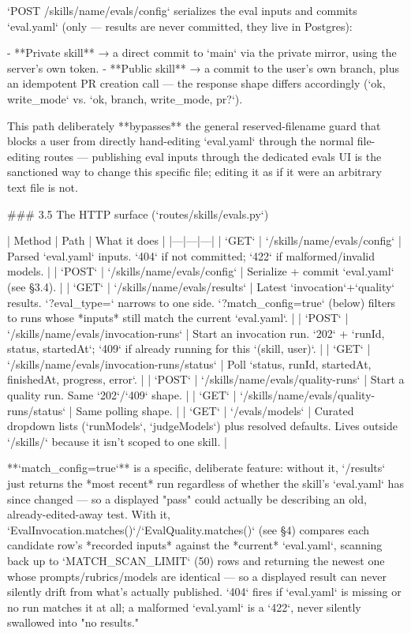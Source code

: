 `POST /skills/{name}/evals/config` serializes the eval inputs and commits `eval.yaml` (only — results are never committed, they live in Postgres):

- **Private skill** → a direct commit to `main` via the private mirror, using the server's own token.
- **Public skill** → a commit to the user's own branch, plus an idempotent PR creation call — the response shape differs accordingly (`{ok, write_mode}` vs. `{ok, branch, write_mode, pr?}`).

This path deliberately **bypasses** the general reserved-filename guard that blocks a user from directly hand-editing `eval.yaml` through the normal file-editing routes — publishing eval inputs through the dedicated evals UI is the sanctioned way to change this specific file; editing it as if it were an arbitrary text file is not.

### 3.5 The HTTP surface (`routes/skills/evals.py`)

| Method | Path | What it does |
|---|---|---|
| `GET` | `/skills/{name}/evals/config` | Parsed `eval.yaml` inputs. `404` if not committed; `422` if malformed/invalid models. |
| `POST` | `/skills/{name}/evals/config` | Serialize + commit `eval.yaml` (see §3.4). |
| `GET` | `/skills/{name}/evals/results` | Latest `invocation`+`quality` results. `?eval_type=` narrows to one side. `?match_config=true` (below) filters to runs whose *inputs* still match the current `eval.yaml`. |
| `POST` | `/skills/{name}/evals/invocation-runs` | Start an invocation run. `202` + `{runId, status, startedAt}`; `409` if already running for this `(skill, user)`. |
| `GET` | `/skills/{name}/evals/invocation-runs/status` | Poll `{status, runId, startedAt, finishedAt, progress, error}`. |
| `POST` | `/skills/{name}/evals/quality-runs` | Start a quality run. Same `202`/`409` shape. |
| `GET` | `/skills/{name}/evals/quality-runs/status` | Same polling shape. |
| `GET` | `/evals/models` | Curated dropdown lists (`runModels`, `judgeModels`) plus resolved defaults. Lives outside `/skills/` because it isn't scoped to one skill. |

**`match_config=true`** is a specific, deliberate feature: without it, `/results` just returns the *most recent* run regardless of whether the skill's `eval.yaml` has since changed — so a displayed "pass" could actually be describing an old, already-edited-away test. With it, `EvalInvocation.matches()`/`EvalQuality.matches()` (see §4) compares each candidate row's *recorded inputs* against the *current* `eval.yaml`, scanning back up to `MATCH_SCAN_LIMIT` (50) rows and returning the newest one whose prompts/rubrics/models are identical — so a displayed result can never silently drift from what's actually published. `404` fires if `eval.yaml` is missing or no run matches it at all; a malformed `eval.yaml` is a `422`, never silently swallowed into "no results."

